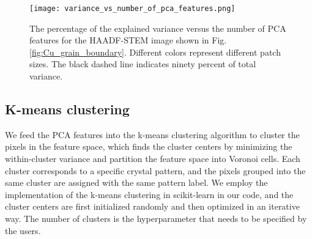 \documentclass[twocolumn,amsmath, floatfix]{revtex4}
\begin{document}
\begin{figure}[htbp]
\centering
\texttt{[image: variance\_vs\_number\_of\_pca\_features.png]}
\caption{The percentage of the explained variance versus the number of PCA features for the HAADF-STEM image shown in Fig. \ref{fig:Cu_grain_boundary}. Different colors represent different patch sizes. The black dashed line indicates ninety percent of total variance.}
\label{fig:variance_vs_number_of_PCA_features}
\end{figure}


\subsection{K-means clustering}
We feed the PCA features into the k-means clustering algorithm \cite{kmeans1967, kmeans2007} to cluster the pixels in the feature space, which finds the cluster centers by minimizing the within-cluster variance and partition the feature space into Voronoi cells.  Each cluster corresponds to a specific crystal pattern, and the pixels grouped into the same cluster are assigned with the same pattern label.  We employ the implementation of the k-means clustering in scikit-learn \cite{scikit-learn} in our code, and the cluster centers are first initialized randomly and then optimized in an iterative way. The number of clusters is the hyperparameter that needs to be specified by the users. 
\end{document}
